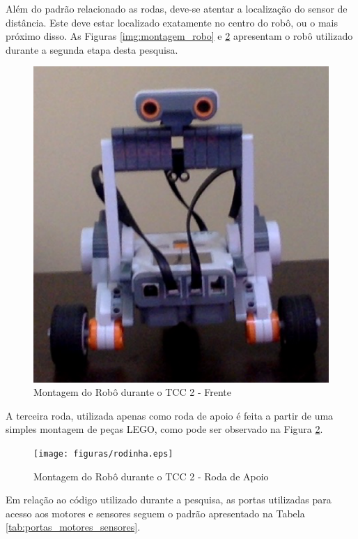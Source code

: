 	Além do padrão relacionado as rodas, deve-se atentar a localização do sensor de distância. Este deve estar localizado exatamente no centro do robô, ou o mais próximo disso. As Figuras \ref{img:montagem_robo}  e \ref{img:montagem_robo_costas} apresentam o robô utilizado durante a segunda etapa desta pesquisa.

	\begin{figure}[H]
		\centering
		\includegraphics[scale=0.7]{figuras/frente.eps}
		\caption[Montagem do Robô 2]{Montagem do Robô durante o TCC 2 - Frente}
		\label{img:img:montagem_robo}
	\end{figure}

	A terceira roda, utilizada apenas como roda de apoio é feita a partir de uma simples montagem de peças LEGO, como pode ser observado na Figura \ref{img:montagem_robo_costas}.

	\begin{figure}[H]
		\centering
		\texttt{[image: figuras/rodinha.eps]}
		\caption[Montagem do Robô 3]{Montagem do Robô durante o TCC 2 - Roda de Apoio}
		\label{img:montagem_robo_costas}
	\end{figure}

	Em relação ao código utilizado durante a pesquisa, as portas utilizadas para acesso aos motores e sensores seguem o padrão apresentado na Tabela \ref{tab:portas_motores_sensores}.

